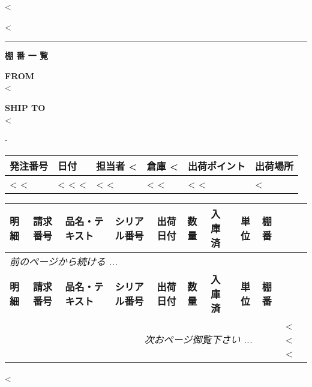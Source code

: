 <%

\begin{CJK}{UTF8}{arialuni}

\vspace*{-3.3cm}
<%

\rule{\textwidth}{0.5pt}

\vspace*{0.5cm}

\centerline{\large\bf{棚 番 一 覧}}
\normalsize

\vspace{1.2cm}

\parbox[t]{.55\textwidth}{
\textbf{FROM} \\
<%
}
\parbox[t]{.40\textwidth}{
\textbf{SHIP TO} \\
<%
}

\vspace{0.5cm}
-
\vspace{0.2cm}

\begin{tabularx}{\textwidth}{*{6}{|X}|} \hline
  \textbf{発注番号} & \textbf{日付} & \textbf{担当者}
  <%
  & \textbf{倉庫}
  <%
  & \textbf{出荷ポイント} & \textbf{出荷場所} \\
  \hline
  <%
  <%
  & <%
  <%
  <%
  & <%
  <%
  & <%
  <%
  & <%
  <%
  & <%
  \hline
\end{tabularx}

\vspace{0.5cm}

\begin{longtable}{|ll p{4.5cm} @{\extracolsep\fill} lcllcl|} \hline
  \textbf{明細} & \textbf{請求番号} & \textbf{品名・テキスト} & \textbf{シリアル番号} & \textbf{出荷日付} &
  \textbf{数量} & \textbf{入庫済} & \textbf{単位} & \textbf{棚番} \\
  \hline
\endfirsthead
  \multicolumn{8}{l}{\emph{前のページから続ける ...}} \\
  \hline
  \textbf{明細} & \textbf{請求番号} & \textbf{品名・テキスト} & \textbf{シリアル番号} & \textbf{出荷日付} &
  \textbf{数量} & \textbf{入庫済} & \textbf{単位} & \textbf{棚番} \\
  \hline
\endhead
   \hline \multicolumn{8}{r}{\emph{次おページ御覧下さい ...}}
\endfoot
   \hline
\endlastfoot
<%
  <%
  <%
  <%
		& & <%
	<%
<%
\end{longtable}
\vfill
<%
\end{CJK}

